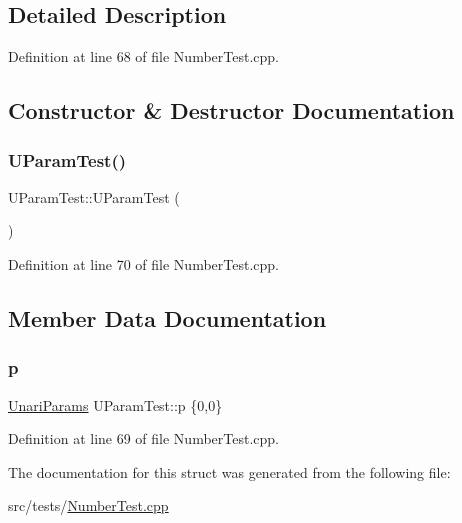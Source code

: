 \subsection{Detailed Description}


Definition at line 68 of file Number\+Test.\+cpp.



\subsection{Constructor \& Destructor Documentation}
\mbox{\label{struct_u_param_test_a4460d7e228030b3a5b6bd35cd59656be}} 
\subsubsection{\texorpdfstring{U\+Param\+Test()}{UParamTest()}}
{\footnotesize\ttfamily U\+Param\+Test\+::\+U\+Param\+Test (\begin{DoxyParamCaption}{ }\end{DoxyParamCaption})\hspace{0.3cm}{\ttfamily [inline]}}



Definition at line 70 of file Number\+Test.\+cpp.



\subsection{Member Data Documentation}
\mbox{\label{struct_u_param_test_ab8f85343a35eded9f31b05a7869608c9}} 
\subsubsection{\texorpdfstring{p}{p}}
{\footnotesize\ttfamily \hyperlink{struct_unari_params}{Unari\+Params} U\+Param\+Test\+::p \{0,0\}}



Definition at line 69 of file Number\+Test.\+cpp.



The documentation for this struct was generated from the following file\+:\begin{DoxyCompactItemize}
\item 
src/tests/\hyperlink{_number_test_8cpp}{Number\+Test.\+cpp}\end{DoxyCompactItemize}
